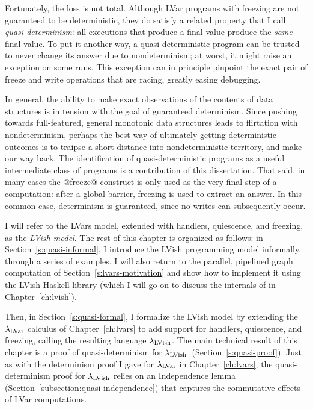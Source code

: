 Fortunately, the loss is not total.  Although LVar programs with
freezing are not guaranteed to be deterministic, they do satisfy a
related property that I call \emph{quasi-determinism}: all executions
that produce a final value produce the \emph{same} final value.  To
put it another way, a quasi-deterministic program can be trusted to
never change its answer due to nondeterminism; at worst, it might
raise an exception on some runs.  This exception can in principle
pinpoint the exact pair of freeze and write operations that are
racing, greatly easing debugging.

In general, the ability to make exact observations of the contents of
data structures is in tension with the goal of guaranteed determinism.
Since pushing towards full-featured, general monotonic data structures
leads to flirtation with nondeterminism, perhaps the best way of
ultimately getting deterministic outcomes is to traipse a short
distance into nondeterministic territory, and make our way back.  The
identification of quasi-deterministic programs as a useful
intermediate class of programs is a contribution of this dissertation.
That said, in many cases the @freeze@ construct is only used as the
very final step of a computation: after a global barrier, freezing is
used to extract an answer.  In this common case, determinism is
guaranteed, since no writes can subsequently occur.

I will refer to the LVars model, extended with handlers, quiescence,
and freezing, as the \emph{LVish model}.  The rest of this chapter is
organized as follows: in Section~\ref{s:quasi-informal}, I introduce
the LVish programming model informally, through a series of examples.
I will also return to the parallel, pipelined graph computation of
Section~\ref{s:lvars-motivation} and show how to implement it using
the LVish Haskell library (which I will go on to discuss the internals
of in Chapter~\ref{ch:lvish}).

Then, in Section~\ref{s:quasi-formal}, I formalize the LVish model by
extending the $\lambda_{\textrm{LVar}}$ calculus of Chapter~\ref{ch:lvars} to add
support for handlers, quiescence, and freezing, calling the resulting
language $\lambda_{\textrm{LVish}}$.  The main technical result of this chapter is
a proof of quasi-determinism for
$\lambda_{\textrm{LVish}}$~(Section~\ref{s:quasi-proof}). Just as with the
determinism proof I gave for $\lambda_{\textrm{LVar}}$ in Chapter~\ref{ch:lvars},
the quasi-determinism proof for $\lambda_{\textrm{LVish}}$ relies on an
Independence lemma (Section~\ref{subsection:quasi-independence}) that
captures the commutative effects of LVar computations.
